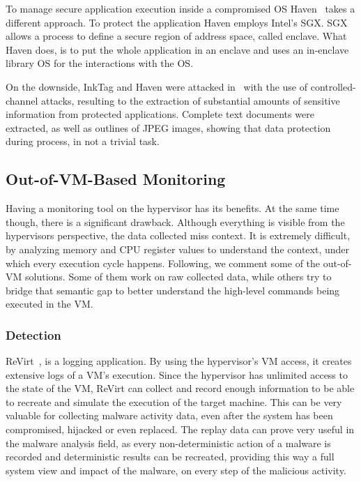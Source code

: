 \par To manage secure application execution inside a compromised \ac{OS} Haven~\cite{baumann2015shielding} takes a different approach. To protect the application Haven employs Intel's \ac{SGX}. \ac{SGX} allows a process to define a secure region of address space, called enclave. What Haven does, is to put the whole application in an enclave and uses an in-enclave library \ac{OS} for the interactions with the \ac{OS}.

\par On the downside, InkTag and Haven were attacked in~\cite{xu2015controlled} with the use of controlled-channel attacks, resulting to the extraction of substantial amounts of sensitive information from protected applications. Complete text documents were extracted, as well as outlines of JPEG images, showing that data protection during process, in not a trivial task. 


\subsection{Out-of-\ac{VM}-Based Monitoring}\label{sub:outvm}
Having a monitoring tool on the hypervisor has its benefits. At the same time though, there is a significant drawback. Although everything is visible from the hypervisors perspective, the data collected miss context. It is extremely difficult, by analyzing memory and \ac{CPU} register values to understand the context, under which every execution cycle happens. Following, we comment some of the out-of-\ac{VM} solutions. Some of them work on raw collected data, while others try to bridge that semantic gap to better understand the high-level commands being executed in the \ac{VM}.

\subsubsection{Detection}

\par ReVirt~\cite{dunlap2002revirt}, is a logging application. By using the hypervisor’s \ac{VM} access, it creates extensive logs of a \ac{VM}’s execution. Since the hypervisor has unlimited access to the state of the \ac{VM}, ReVirt can collect and record enough information to be able to recreate and simulate the execution of the target machine. This can be very valuable for collecting malware activity data, even after the system has been compromised, hijacked or even replaced. The replay data can prove very useful in the malware analysis field, as every non-deterministic action of a malware is recorded and deterministic results can be recreated, providing this way a full system view and impact of the malware, on every step of the malicious activity.

